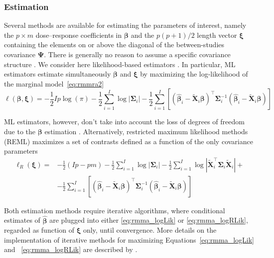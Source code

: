 \documentclass[11pt,a4paper,twoside,openany]{book}\usepackage{knitr}
\begin{document}
{{\subsubsection*{Estimation}

Several methods are available for estimating the parameters of interest, namely the $p \times m$ dose--response coefficients in $\boldsymbol{\beta}$ and the $p(p+1)/2$ length vector $\boldsymbol{\xi}$ containing the elements on or above the diagonal of the between-studies covariance $\boldsymbol{\Psi}$. There is generally no reason to assume a specific covariance structure \citep{white2011multivariate}. We consider here likelihood-based estimators \citep{verbeke1997linear, pinheiro2010mixed}. In particular, ML estimators estimate simultaneously $\boldsymbol{\beta}$ and $\boldsymbol{\xi}$ by maximizing the log-likelihood of the marginal model~\ref{eq:rmmra2}
\begin{equation}
\ell\left(\boldsymbol{\beta}, \boldsymbol{\xi} \right) = -\frac{1}{2}Ip\log(\pi) -\frac{1}{2}\sum_{i=1}^I \log |\boldsymbol{\Sigma}_i| - \frac{1}{2}\sum_{i=1}^I\left[ \left(\boldsymbol{\hat \beta}_i - \widetilde{\mathbf{X}}_i\boldsymbol{\beta} \right)^\top \boldsymbol{\Sigma}_i^{-1} \left(\boldsymbol{\hat \beta}_i - \widetilde{\mathbf{X}}_i\boldsymbol{\beta} \right) \right]
\label{eq:rmma_logLik}
\end{equation}

\noindent ML estimators, however, don’t take into account the loss of degrees of freedom due to the $\boldsymbol{\beta}$ estimation \citep{harville1977maximum}. Alternatively, restricted maximum likelihood methods (REML) maximizes a set of contrasts defined as a function of the only covariance parameters
\begin{equation}
\begin{split}
\ell_R\left(\boldsymbol{\xi} \right) =& -\frac{1}{2}\left(Ip - pm\right) -\frac{1}{2}\sum_{i=1}^I \log |\boldsymbol{\Sigma}_i| -\frac{1}{2}\sum_{i=1}^I \log \left|\widetilde{\mathbf{X}}_i^\top\boldsymbol{\Sigma}_i\widetilde{\mathbf{X}}_i \right| + \\
&- \frac{1}{2}\sum_{i=1}^I\left[ \left(\boldsymbol{\hat \beta}_i - \widetilde{\mathbf{X}}_i\boldsymbol{\beta} \right)^\top \boldsymbol{\Sigma}_i^{-1} \left(\boldsymbol{\hat \beta}_i - \widetilde{\mathbf{X}}_i\boldsymbol{\beta} \right) \right]
\end{split}
\label{eq:rmma_logRLik}
\end{equation}

\noindent Both estimation methods require iterative algorithms, where conditional estimates of $\boldsymbol{\hat \beta}$ are plugged into either \ref{eq:rmma_logLik} or \ref{eq:rmma_logRLik}, regarded as function of $\boldsymbol{\xi}$ only, until convergence. More details on the implementation of iterative methods for maximizing Equations~\ref{eq:rmma_logLik} and ~\ref{eq:rmma_logRLik} are described by \cite{gasparrini2012multivariate}.


}}
\end{document}
